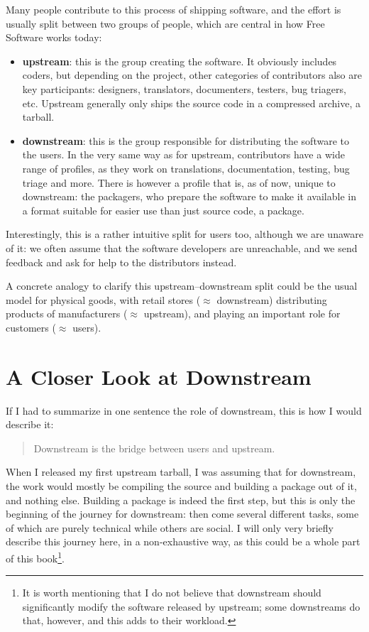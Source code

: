 Many people contribute to this process of shipping software, and the effort is
usually split between two groups of people, which are central in how Free
Software works today:

\begin{itemize}
\item \textbf{upstream}: this is the group creating the software. It obviously
includes coders, but depending on the project, other categories of contributors
also are key participants: designers, translators, documenters, testers, bug
triagers, etc. Upstream generally only ships the source code in a compressed
archive, a tarball.
\item \textbf{downstream}: this is the group responsible for distributing the
software to the users. In the very same way as for upstream, contributors have
a wide range of profiles, as they work on translations, documentation, testing,
bug triage and more. There is however a profile that is, as of now, unique to
downstream: the packagers, who prepare the software to make it available in a
format suitable for easier use than just source code, a package.
\end{itemize}

Interestingly, this is a rather intuitive split for users too, although we are
unaware of it: we often assume that the software developers are unreachable,
and we send feedback and ask for help to the distributors instead.

A concrete analogy to clarify this upstream--downstream split could be the
usual model for physical goods, with retail stores ($\approx$ downstream)
distributing products of manufacturers ($\approx$ upstream), and playing an
important role for customers ($\approx$ users).

\section*{A Closer Look at Downstream}

If I had to summarize in one sentence the role of downstream, this is how I
would describe it:
\begin{quote}
Downstream is the bridge between users and upstream.
\end{quote}

When I released my first upstream tarball, I was assuming that for downstream,
the work would mostly be compiling the source and building a package out of it,
and nothing else. Building a package is indeed the first step, but this is only
the beginning of the journey for downstream: then come several different tasks,
some of which are purely technical while others are social. I will only very
briefly describe this journey here, in a non-exhaustive way, as this could be a
whole part of this book\footnote{It is worth mentioning that I do not believe
that downstream should significantly modify the software released by upstream;
some downstreams do that, however, and this adds to their workload.}.

